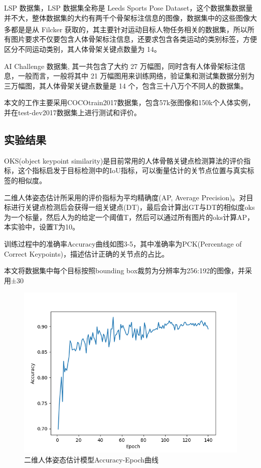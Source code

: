 LSP 数据集，LSP 数据集全称是 Leeds Sports Pose Dataset，这个数据集数据量并不大，整体数据集的大约有两千个骨架标注信息的图像，数据集中的这些图像大多都是是从 Filcker 获取的\textsuperscript{\cite{p17}}，其主要针对运动目标人物任务相关的数据集，所以所有图片要求不仅要包含人体骨架标注信息，还要求包含各类运动的类别标签，方便区分不同运动类别，其人体骨架关键点数量为 14。

AI Challenge 数据集, 其一共包含了大约 27 万幅图，同时含有人体骨架标注信息，一般而言，一般将其中 21 万幅图用来训练网络，验证集和测试集数据分别为三万幅图，其人体骨架关键点数量是 14 个，包含三十八万个不同人的数据集。

本文的工作主要采用COCOtrain2017数据集，包含57k张图像和150k个人体实例，并在test-dev2017数据集上进行测试和评价。

\subsection{实验结果}{}
OKS(object keypoint similarity)是目前常用的人体骨骼关键点检测算法的评价指标，这个指标启发于目标检测中的IoU指标，可以衡量估计的关节点位置与真实标签的相似度。

二维人体姿态估计所采用的评价指标为平均精确度(AP, Average Precision)。对目标进行关键点检测后会获得一组关键点(DT)，最后会计算出GT与DT的相似度oks为一个标量，然后人为的给定一个阈值T，然后可以通过所有图片的oks计算AP，本实验中，设置T为10。

训练过程中的准确率Accuracy曲线如图3-5，其中准确率为PCK(Percentage of Correct Keypoints)，描述估计正确的关节点的占比。

本文将数据集中每个目标按照bounding box裁剪为分辨率为256:192的图像，并采用±30%

\begin{figure}[h]
	\centering
	\includegraphics[scale=0.8]{figures/20.png}
	\caption{二维人体姿态估计模型Accuracy-Epoch曲线}
	\label{fig:f20}
\end{figure}

